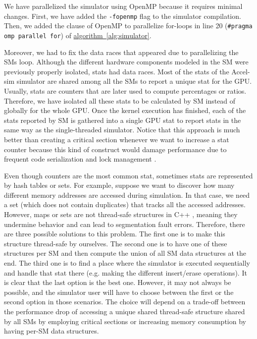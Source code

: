 \par
We have parallelized the simulator using OpenMP because it requires minimal changes. First, we have added the \texttt{-fopenmp} flag to the simulator compilation. Then, we added the clause of OpenMP to parallelize for-loops in line 20
(\texttt{\#pragma omp parallel for}) of \hyperref[alg:simulator]{algorithm~\ref*{alg:simulator}}.

\par
Moreover, we had to fix the data races that appeared due to parallelizing the SMs loop. Although the different hardware components modeled in the SM were previously properly isolated,  stats had data races. Most of the stats of the Accel-sim simulator are shared among all the SMs to report a unique stat for the GPU. Usually, stats are counters that are later used to compute percentages or ratios. Therefore, we have isolated all these stats to be calculated by SM instead of globally for the whole GPU. Once the kernel execution has finished, each of the stats reported by SM is gathered into a single GPU stat to report stats in the same way as the single-threaded simulator. Notice that this approach is much better than creating a critical section whenever we want to increase a stat counter because this kind of construct would damage performance due to frequent code serialization and lock management \cite{criticalSectionOpenMP}.

\par
Even though counters are the most common stat, sometimes stats are represented by hash tables or sets. For example, suppose we want to discover how many different memory addresses are accessed during simulation. In that case, we need a set (which does not contain duplicates) that tracks all the accessed addresses. However, maps or sets are not thread-safe structures in C++ \cite{stlThreadSafe}, meaning they undermine behavior and can lead to segmentation fault errors. Therefore, there are three possible solutions to this problem. The first one is to make this structure thread-safe by ourselves. The second one is to have one of these structures per SM and then compute the union of all SM data structures at the end. The third one is to find a place where the simulator is executed sequentially and handle that stat there (e.g. making the different insert/erase operations). It is clear that the last option is the best one. However, it may not always be possible, and the simulator user will have to choose between the first or the second option in those scenarios. The choice will depend on a trade-off between the performance drop of accessing a unique shared thread-safe structure shared by all SMs by employing critical sections or increasing memory consumption by having per-SM data structures.
